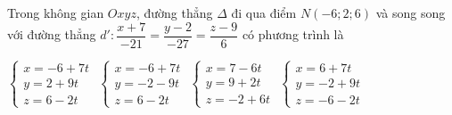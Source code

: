 \documentclass[12pt,a4paper]{article}
\begin{document}
\begin{ex}
 Trong không gian ${Oxyz}$, đường thẳng ${\Delta}$ đi qua điểm ${N(-6;2;6)}$ và song song với đường thẳng $d':\dfrac{x + 7}{-21}=\dfrac{y - 2}{-27}=\dfrac{z - 9}{6}$ có phương trình là
 
\choice
{ \True $\left\{ \begin{array}{l}x = -6+7t\\ y = 2+9t\\z = 6-2t\end{array} \right.$ }
   { $\left\{ \begin{array}{l}x = -6+7t\\ y = -2-9t\\z = 6-2t\end{array} \right.$ }
     { $\left\{ \begin{array}{l}x = 7-6t\\ y = 9+2t\\z = -2+6t\end{array} \right.$ }
    { $\left\{ \begin{array}{l}x = 6+7t\\ y = -2+9t\\z = -6-2t\end{array} \right.$ }
\end{ex}
\end{document}
